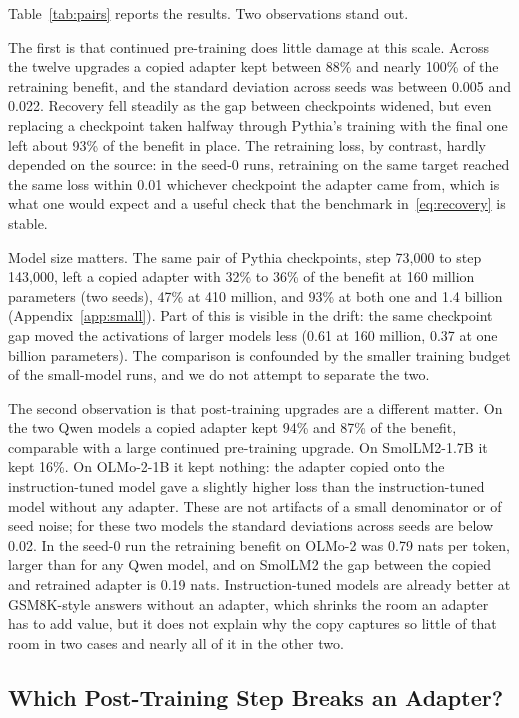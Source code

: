 \documentclass[ijds,blindrev]{informs4}
\begin{document}
Table~\ref{tab:pairs} reports the results. Two observations stand out.

The first is that continued pre-training does little damage at this scale. Across the twelve upgrades a copied adapter kept between 88\% and nearly 100\% of the retraining benefit, and the standard deviation across seeds was between 0.005 and 0.022. Recovery fell steadily as the gap between checkpoints widened, but even replacing a checkpoint taken halfway through Pythia's training with the final one left about 93\% of the benefit in place. The retraining loss, by contrast, hardly depended on the source: in the seed-0 runs, retraining on the same target reached the same loss within 0.01 whichever checkpoint the adapter came from, which is what one would expect and a useful check that the benchmark in~\eqref{eq:recovery} is stable.

Model size matters. The same pair of Pythia checkpoints, step 73{,}000 to step 143{,}000, left a copied adapter with 32\% to 36\% of the benefit at 160 million parameters (two seeds), 47\% at 410 million, and 93\% at both one and 1.4 billion (Appendix~\ref{app:small}). Part of this is visible in the drift: the same checkpoint gap moved the activations of larger models less (0.61 at 160 million, 0.37 at one billion parameters). The comparison is confounded by the smaller training budget of the small-model runs, and we do not attempt to separate the two.

The second observation is that post-training upgrades are a different matter. On the two Qwen models a copied adapter kept 94\% and 87\% of the benefit, comparable with a large continued pre-training upgrade. On SmolLM2-1.7B it kept 16\%. On OLMo-2-1B it kept nothing: the adapter copied onto the instruction-tuned model gave a slightly higher loss than the instruction-tuned model without any adapter. These are not artifacts of a small denominator or of seed noise; for these two models the standard deviations across seeds are below 0.02. In the seed-0 run the retraining benefit on OLMo-2 was 0.79 nats per token, larger than for any Qwen model, and on SmolLM2 the gap between the copied and retrained adapter is 0.19 nats. Instruction-tuned models are already better at GSM8K-style answers without an adapter, which shrinks the room an adapter has to add value, but it does not explain why the copy captures so little of that room in two cases and nearly all of it in the other two.

\subsection{Which Post-Training Step Breaks an Adapter?}\label{sec:stages}
\end{document}

